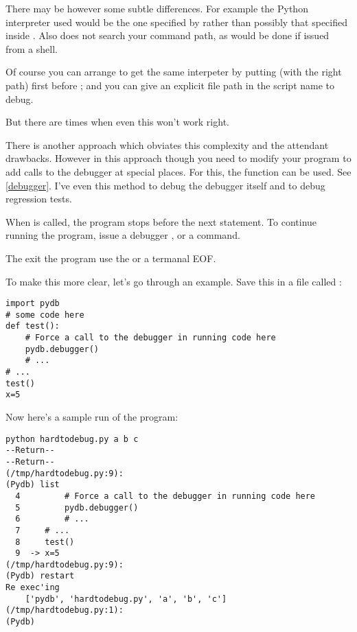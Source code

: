 There may be however some subtle differences. For example the Python
interpreter used would be the one specified by  rather than
possibly that specified inside . Also 
does not search your command path, as would be done if issued from a
shell.

Of course you can arrange to get the same interpeter by putting
 (with the right path) first before ; and you
can give an explicit file path in the script name to debug.

But there are times when even this won't work right.

There is another approach which obviates this complexity and the
attendant drawbacks. However in this approach though you need to
modify your program to add calls to the debugger at special
places. For this, the  function  can be
used. See \ref{debugger}. I've even this method to debug the debugger
itself and to debug regression tests.

When  is called, the program stops before the
next statement. To continue running the program, issue a debugger
,  or a  command.

The exit the program use the  or a termanal EOF.

To make this more clear, let's go through an example. Save this in a
file called :

\begin{verbatim}
import pydb
# some code here
def test():
    # Force a call to the debugger in running code here
    pydb.debugger()
    # ...
# ...
test()
x=5
\end{verbatim}

Now here's a sample run of the program:

\begin{verbatim}
python hardtodebug.py a b c
--Return--
--Return--
(/tmp/hardtodebug.py:9):
(Pydb) list
  4         # Force a call to the debugger in running code here
  5         pydb.debugger()
  6         # ...
  7     # ...
  8     test()
  9  -> x=5
(/tmp/hardtodebug.py:9): 
(Pydb) restart
Re exec'ing
	['pydb', 'hardtodebug.py', 'a', 'b', 'c']
(/tmp/hardtodebug.py:1): 
(Pydb) 
\end{verbatim}

